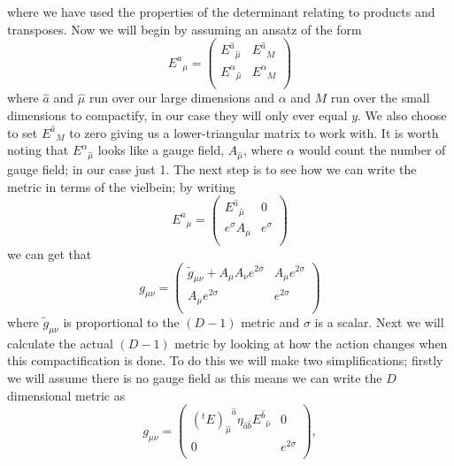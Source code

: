 \documentclass[12pt]{article}
\numberwithin{equation}{section}
\numberwithin{figure}{section}
\begin{document}
where we have used the properties of the determinant relating to products and transposes. 
Now we will begin by assuming an ansatz of the form 
\begin{equation}
	{E^{a}}_{\mu}= 
		\begin{pmatrix}
		{E^{\hat{a}}}_{\hat{\mu}} & {E^{\hat{a}}}_{M}\\
		{E^{\alpha}}_{\hat{\mu}} & {E^{\alpha}}_{M} \\
	\end{pmatrix}
\end{equation}
where $\hat{a}$ and $\hat{\mu}$ run over our large dimensions and $\alpha$ and $M$ run over the small dimensions to compactify, in our case they will only ever equal $y$. We also choose to set $ {E^{\hat{a}}}_{M}$ to zero giving us a lower-triangular matrix to work with. It is worth noting that ${E^{\alpha}}_{\hat{\mu}}$ looks like a gauge field, $A_{\hat{\mu}}$, where $\alpha$ would count the number of gauge field; in our case just 1. The next step is to see how we can write the metric in terms of the vielbein; by writing 
\begin{equation}
	{E^{a}}_{\mu}= 
		\begin{pmatrix}
		{E^{\hat{a}}}_{\hat{\mu}} & 0\\
		e^{\sigma}A_{\mu} & e^{\sigma} \\
	\end{pmatrix}
\end{equation}
we can get that 
\begin{equation}
	g_{\mu\nu}= 
		\begin{pmatrix}
		\tilde{g}_{\mu\nu} +A_{\mu}A_{\nu}e^{2\sigma} & A_{\mu}e^{2\sigma}\\
		A_{\mu}e^{2\sigma} & e^{2\sigma} \\
	\end{pmatrix}
\end{equation}
where $\tilde{g}_{\mu\nu}$ is proportional to the $(D-1)$ metric and $\sigma$ is a scalar. Next we will calculate the actual $(D-1)$ metric by looking at how the action changes when this compactification is done. To do this we will make two simplifications; firstly we will assume there is no gauge field as this means we can write the $D$ dimensional metric as
\begin{equation}
		g_{\mu\nu}= 
		\begin{pmatrix}
		{(^{t}E)_{\hat{\mu}}}^{\hat{a}}\eta_{\hat{a}\hat{b}}{E^{\hat{b}}}_{\hat{\nu}} & 0\\
		0 & e^{2\sigma} \\
	\end{pmatrix},
\end{equation}
\end{document}
